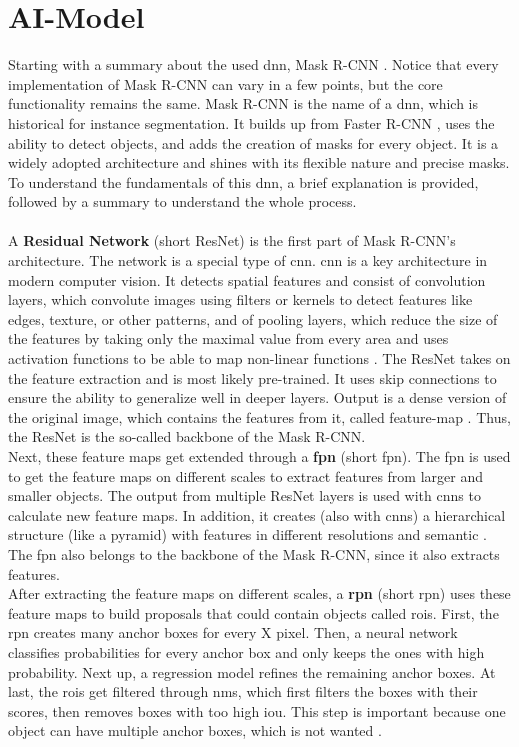	\section{AI-Model}
	\label{sec:ai-model}
		Starting with a summary about the used \ac{dnn}, Mask R-CNN \cite{Kaiming2017}. Notice that every implementation of Mask R-CNN can vary in a few points, but the core functionality remains the same.
		Mask R-CNN is the name of a \ac{dnn}, which is historical for instance segmentation. It builds up from Faster R-CNN \cite{Ren2016}, uses the ability to detect objects, and adds the creation of masks for every object. It is a widely adopted architecture and shines with its flexible nature and precise masks.\\
		To understand the fundamentals of this \ac{dnn}, a brief explanation is provided, followed by a summary to understand the whole process.\\
		\\
		A \textbf{Residual Network} (short ResNet) is the first part of Mask R-CNN's architecture. The network is a special type of \ac{cnn}. \ac{cnn} is a key architecture in modern computer vision. It detects spatial features and consist of convolution layers, which convolute images using filters or kernels to detect features like edges, texture, or other patterns, and of pooling layers, which reduce the size of the features by taking only the maximal value from every area and uses activation functions to be able to map non-linear functions \cite{Oshea2015}. The ResNet takes on the feature extraction and is most likely pre-trained. It uses skip connections to ensure the ability to generalize well in deeper layers. Output is a dense version of the original image, which contains the features from it, called feature-map \cite{He2015}. Thus, the ResNet is the so-called backbone of the Mask R-CNN.\\
		Next, these feature maps get extended through a \textbf{\acl{fpn}} (short \ac{fpn}). The \ac{fpn} is used to get the feature maps on different scales to extract features from larger and smaller objects. The output from multiple ResNet layers is used with \ac{cnn}s to calculate new feature maps. In addition, it creates (also with \ac{cnn}s) a hierarchical structure (like a pyramid) with features in different resolutions and semantic \cite{Lin2017}. The \ac{fpn} also belongs to the backbone of the Mask R-CNN, since it also extracts features.\\
		After extracting the feature maps on different scales, a \textbf{\acl{rpn}} (short \ac{rpn}) uses these feature maps to build proposals that could contain objects called \ac{roi}s. First, the \ac{rpn} creates many anchor boxes for every X pixel. Then, a neural network classifies probabilities for every anchor box and only keeps the ones with high probability. Next up, a regression model refines the remaining anchor boxes. At last, the \ac{roi}s get filtered through \ac{nms}, which first filters the boxes with their scores, then removes boxes with too high \ac{iou}. This step is important because one object can have multiple anchor boxes, which is not wanted \cite{Ren2016}.\\
